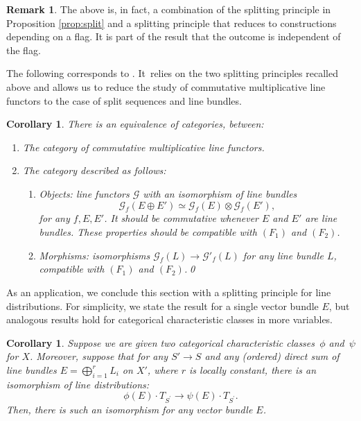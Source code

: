 \documentclass[11pt]{article}
\theoremstyle{plain}
\newtheorem{corollary}[theorem]{Corollary}
\theoremstyle{definition}
\newtheorem{remark}[theorem]{Remark}
\newcommand{\Gcal}{\mathcal G}
\begin{document}
\begin{remark}\label{rmk:indepedenceoffiltration}
The above is, in fact, a combination of the splitting principle in Proposition \ref{prop:split} and a splitting principle that reduces to constructions depending on a flag. It is part of the result that the outcome is independent of the flag.
\end{remark}

The following corresponds to \cite[Prop.\,2.16 \& Prop.\,2.19 \& Cor.\,2.20]{Eriksson-Freixas-Wentworth}. It~relies on the two splitting principles recalled above and allows us to reduce the study of commutative multiplicative line functors to the case of split sequences and line bundles.
\begin{corollary} \label{Cor:2ndsplitting}
There is an equivalence of categories, between:
\begin{enumerate}
\item The category of commutative multiplicative line functors.
\item The category described as follows:
\begin{enumerate}
\item Objects: line functors $\Gcal$ with an isomorphism of line bundles\vspace*{-3pt}\enlargethispage{.5\baselineskip}
\[
\Gcal_f(E \oplus E') \simeq \Gcal_f(E) \otimes \Gcal_f(E'),
\]
for any $f, E, E'$.
It should be commutative whenever $E$ and $E'$ are line bundles. These properties should be compatible with $(F_1)$ and $(F_2)$.
\item Morphisms: isomorphisms $\Gcal_f(L) \to \Gcal'_f(L)$ for any line bundle $L$, compatible with $(F_1)$ and $(F_2)$.\qed
\end{enumerate}
\end{enumerate}
\end{corollary}

As an application, we conclude this section with a splitting principle for line distributions. For simplicity, we state the result for a single vector bundle $E$, but analogous results hold for categorical characteristic classes in more variables.

\begin{corollary} \label{cor:splittingdistribution}
Suppose we are given two categorical characteristic classes~$\phi$ and~$\psi$ for $X$. Moreover, suppose that for any $S' \to S$ and any (ordered) direct sum of line bundles $E = \bigoplus_{i=1}^r L_i$ on $X'$, where $r$ is locally constant, there is an isomorphism of line distributions:\vspace*{-3pt}
\begin{displaymath}
\phi(E) \cdot T_{S^{\prime}} \to \psi(E) \cdot T_{S^{\prime}}.
\end{displaymath}
Then, there is such an isomorphism for any vector bundle $E$.
\end{corollary}
\end{document}
